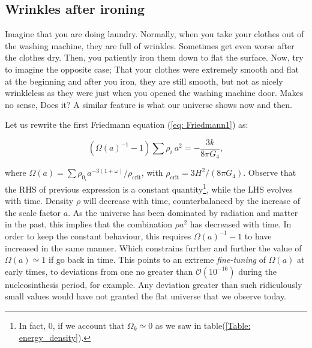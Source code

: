 \documentclass[11pt, a4paper]{article} %
\begin{document}
\subsection*{Wrinkles after ironing}

Imagine that you are doing laundry. Normally, when you take your clothes out of the washing machine, they are full of wrinkles. Sometimes get even worse after the clothes dry. Then, you patiently iron them down to flat the surface. Now, try to imagine the opposite case; That your clothes were extremely smooth and flat at the beginning and after you iron, they are still smooth, but not as nicely wrinkleless as they were just when you opened the washing machine door. Makes no sense, Does it? A similar feature is what our universe shows now and then.

Let us rewrite the first Friedmann equation (\ref{eq: Friedmann1}) as:

\begin{equation}\label{eq: divergence_Friedmann}
	\left(\Omega(a)^{-1} - 1\right) \sum \rho_{i} \: a^{2} = -\frac{3k}{8 \pi G_{4}},
\end{equation}

where $\Omega(a) = \sum \rho_{0_{i}} a^{-3(1+\omega)}/\rho_{\text{crit}}$, with $\rho_{\text{crit}} = 3 H^{2}/(8 \pi G_{4})$. Observe that the RHS of previous expression is a constant quantity\footnote{In fact, 0, if we account that $\Omega_{k} \simeq 0$ as we saw in table(\ref{Table: energy_density}).}, while the LHS evolves with time. Density $\rho$ will decrease with time, counterbalanced by the increase of the scale factor $a$. As the universe has been dominated by radiation and matter in the past, this implies that the combination $\rho a^{2}$ has decreased with time. In order to keep the constant behaviour, this requires $\Omega(a)^{-1} -1$ to have increased in the same manner. Which constrains further and further the value of $\Omega(a) \simeq 1$ if go back in time. This points to an extreme \textit{fine-tuning} of $\Omega(a)$ at early times, to deviations from one no greater than $\mathcal{O}(10^{-16})$ during the nucleosinthesis period, for example. Any deviation greater than such ridiculously small values would have not granted the flat universe that we observe today. 








\end{document}
